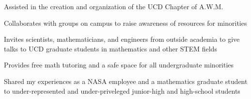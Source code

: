 \documentclass[letterpaper]{deedy-resume} %
\begin{document}
\begin{minipage}[t]{0.66\textwidth}
\vspace{4pt} %

\begin{tightitemize}
    \item Assisted in the creation and organization of the UCD Chapter of A.W.M.
    \item Collaborates with groups on campus to raise awareness of resources for minorities
\end{tightitemize}

\vspace{4pt}



\begin{tightitemize}
    \item Invites scientists, mathematicians, and engineers from outside academia to give talks to UCD graduate students in mathematics and other STEM fields
\end{tightitemize}

\vspace{4pt}

\begin{tightitemize}
    \item Provides free math tutoring and a safe space for all undergraduate minorities
\end{tightitemize}

\vspace{4pt}

\begin{tightitemize}
    \item Shared my experiences as a NASA employee and a mathematics graduate student to under-represented and under-priveleged junior-high and high-school students
\end{tightitemize}


\end{minipage} %
\end{document}
